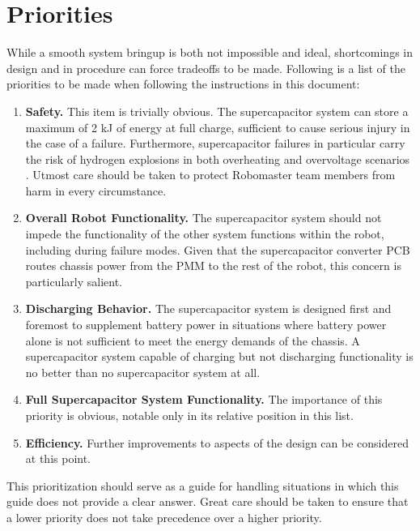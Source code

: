 \documentclass[]{report}
\begin{document}
\section{Priorities}
While a smooth system bringup is both not impossible and ideal, shortcomings in design and in procedure can force tradeoffs to be made. Following is a list of the priorities to be made when following the instructions in this document:
\begin{enumerate}
	\item \textbf{Safety.} This item is trivially obvious. The supercapacitor system can store a maximum of 2 kJ of energy at full charge, sufficient to cause serious injury in the case of a failure. Furthermore, supercapacitor failures in particular carry the risk of hydrogen explosions in both overheating and overvoltage scenarios \cite{MAZLOOMIAN2025104115}. Utmost care should be taken to protect Robomaster team members from harm in every circumstance. 
	\item \textbf{Overall Robot Functionality.} The supercapacitor system should not impede the functionality of the other system functions within the robot, including during failure modes. Given that the supercapacitor converter PCB routes chassis power from the PMM to the rest of the robot, this concern is particularly salient. 
	\item \textbf{Discharging Behavior.} The supercapacitor system is designed first and foremost to supplement battery power in situations where battery power alone is not sufficient to meet the energy demands of the chassis. A supercapacitor system capable of charging but not discharging functionality is no better than no supercapacitor system at all. 
	\item \textbf{Full Supercapacitor System Functionality.} The importance of this priority is obvious, notable only in its relative position in this list. 
	\item \textbf{Efficiency.} Further improvements to aspects of the design can be considered at this point. 
\end{enumerate}
This prioritization should serve as a guide for handling situations in which this guide does not provide a clear answer. Great care should be taken to ensure that a lower priority does not take precedence over a higher priority. 
\end{document}
